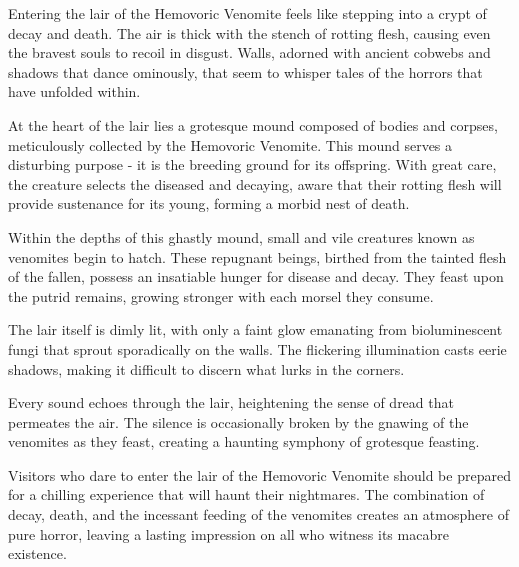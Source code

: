 Entering the lair of the Hemovoric Venomite feels like stepping into a crypt of decay and death. The air is thick with the stench of rotting flesh, causing even the bravest souls to recoil in disgust. Walls, adorned with ancient cobwebs and shadows that dance ominously, that seem to whisper tales of the horrors that have unfolded within.

At the heart of the lair lies a grotesque mound composed of bodies and corpses, meticulously collected by the Hemovoric Venomite. This mound serves a disturbing purpose - it is the breeding ground for its offspring. With great care, the creature selects the diseased and decaying, aware that their rotting flesh will provide sustenance for its young, forming a morbid nest of death.

Within the depths of this ghastly mound, small and vile creatures known as venomites begin to hatch. These repugnant beings, birthed from the tainted flesh of the fallen, possess an insatiable hunger for disease and decay. They feast upon the putrid remains, growing stronger with each morsel they consume.

The lair itself is dimly lit, with only a faint glow emanating from bioluminescent fungi that sprout sporadically on the walls. The flickering illumination casts eerie shadows, making it difficult to discern what lurks in the corners.

Every sound echoes through the lair, heightening the sense of dread that permeates the air. The silence is occasionally broken by the gnawing of the venomites as they feast, creating a haunting symphony of grotesque feasting.

Visitors who dare to enter the lair of the Hemovoric Venomite should be prepared for a chilling experience that will haunt their nightmares. The combination of decay, \linebreak\hspace*{1.75cm}death, and the incessant feeding of the \linebreak\hspace*{2.5cm}venomites creates an atmosphere of pure \linebreak\hspace*{4cm} horror, leaving a lasting \linebreak\hspace*{4.5cm} impression on all who witness \linebreak\hspace*{5cm} its macabre existence. \linebreak
